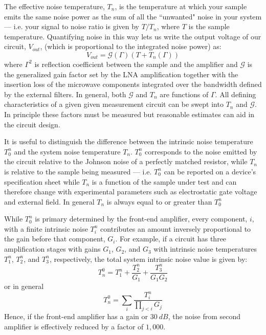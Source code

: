 The effective noise temperature, $T_n$, is the temperature at which your sample emits the same noise power as the sum of all the ``unwanted" noise in your system --- i.e. your signal to noise ratio is given by $T/T_n$, where $T$ is the sample temperature. Quantifying noise in this way lets us write the output voltage of our circuit, $V_{out}$, (which is proportional to the integrated noise power) as:
\begin{equation}\label{eq:power_output}
V_{out} = \mathcal{G}(\Gamma)(T+T_n(\Gamma))
\end{equation}
where $\Gamma^2$ is reflection coefficient between the sample and the amplifier and $\mathcal{G}$ is the generalized gain factor set by the LNA amplification together with the insertion loss of the microwave components integrated over the bandwidth defined by the external filters. In general, both $\mathcal{G}$ and $T_n$ are functions of $\Gamma$. All defining characteristics of a given given measurement circuit can be swept into $T_n$ and $\mathcal{G}$. In principle these factors must be measured but reasonable estimates can aid in the circuit design.

It is useful to distinguish the difference between the intrinsic noise temperature $T_0^n$ and the system noise temperature $T_n$. $T_0^n$ corresponds to the noise emitted by the circuit relative to the Johnson noise of a perfectly matched resistor, while $T_n$ is relative to the sample being measured --- i.e. $T_0^n$ can be reported on a device's specification sheet while $T_n$ is a function of the sample under test and can therefore change with experimental parameters such as electrostatic gate voltage and external field. In general $T_n$ is always equal to or greater than $T_0^n$

While $T_0^n$ is primary determined by the front-end amplifier, every component, $i$, with a finite intrinsic noise $T_i^n$ contributes an amount inversely proportional to the gain before that component, $G_i$. For example, if a circuit has three amplification stages with gains $G_1$, $G_2$, and $G_3$ with intrinsic noise temperatures $T_1^n$, $T_2^n$, and $T_3^n$, respectively, the total system intrinsic noise value is given by:
\begin{equation}
T_n^0 = T_1^n+\frac{T_2^n}{G_1}+\frac{T_3^n}{G_1G_2}
\end{equation}
or in general
\begin{equation}
T_n^0 = \sum_{i}\frac{T_i^n}{\prod_{j<i}G_j}
\end{equation}
Hence, if the front-end amplifier has a gain or $30~dB$, the noise from second amplifier is effectively reduced by a factor of $1,000$.

